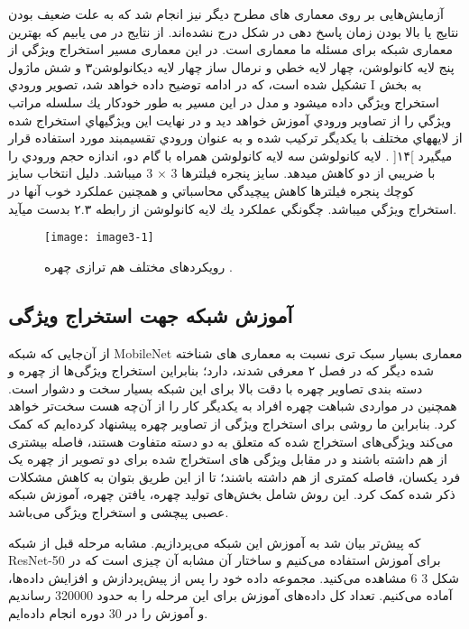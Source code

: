 آزمایش‌هایی بر روی معماری های مطرح دیگر نیز انجام شد که به علت ضعیف بودن نتایج یا بالا بودن زمان پاسخ دهی در شکل درج نشده‌اند. از نتایج در می یابیم که بهترین معماری شبکه برای مسئله ما معماری  است.
\noindent
در این معماری مسير استخراج ويژگي از پنج لايه كانولوشن، چهار لايه خطي و نرمال ساز چهار لايه ديكانولوشن۳ و شش ماژول  تشکیل شده است، كه در ادامه توضيح داده خواهد شد، تصوير ورودي I به بخش استخراج ويژگي داده ميشود و مدل در اين مسير به طور خودكار يك سلسله مراتب ويژگي را از تصاوير ورودي آموزش خواهد ديد و در نهايت اين ويژگيهاي استخراج شده از لايههاي مختلف با يكديگر تركيب شده و به عنوان ورودي تقسيمبند مورد استفاده قرار ميگيرد ]۱۴[ .
\noindent
لايه كانولوشن
سه لايه كانولوشن همراه با گام دو، اندازه حجم ورودي را با ضريبي از دو كاهش ميدهد. سايز پنجره فيلترها 3 × 3 ميباشد. دليل انتخاب سايز كوچك پنجره فيلترها كاهش پيچيدگي محاسباتي و همچنين عملكرد خوب آنها در استخراج ويژگي ميباشد. چگونگي عملكرد يك لايه كانولوشن از رابطه ۲.۳ بدست
ميآيد.
 \begin{figure}[h]
\centering
  \texttt{[image: image3-1]}
  \caption{رویکردهای مختلف هم ترازی چهره \cite{ref1}.}
  \label{image2-1}
\end{figure}


\subsection{آموزش شبکه جهت استخراج ویژگی}
از آن‌جایی که ‌شبکه MobileNet معماری بسیار سبک تری نسبت به معماری های شناخته شده دیگر که در فصل ۲ معرفی شدند، دارد؛ بنابراین استخراج ویژگی‌ها از چهره و دسته بندی تصاویر چهره با دقت بالا برای این شبکه بسیار سخت و دشوار است. همچنین در مواردی شباهت چهره افراد به یکدیگر ‌کار را از آن‌چه هست سخت‌تر خواهد کرد. بنابراین ما روشی برای استخراج ویژگی از تصاویر چهره پیشنهاد کرده‌ایم که کمک می‌کند ویژگی‌های استخراج شده که متعلق به دو دسته متفاوت هستند، فاصله بیشتری از هم داشته باشند و در مقابل ویژگی های استخراج شده برای دو تصویر از چهره یک فرد یکسان، فاصله کمتری از هم داشته باشند؛ تا از این طریق بتوان به کاهش مشکلات ذکر شده کمک کرد. این روش شامل بخش‌های تولید چهره، یافتن چهره، آموزش شبکه عصبی پیچشی و ‌استخراج ویژگی می‌باشد.

که پیش‌تر بیان شد به آموزش این شبکه می‌پردازیم. مشابه مرحله قبل از شبکه ResNet-50 برای آموزش استفاده می‌کنیم و ساختار آن مشابه آن چیزی است که در شکل ‏3 6 مشاهده می‌کنید. مجموعه داده خود را پس از پیش‌پردازش و افزایش‌ داده‌ها، آماده می‌کنیم. تعداد کل داده‌های آموزش برای این مرحله را به حدود 320000 رساندیم و آموزش را در 30 دوره انجام داده‌ایم.

